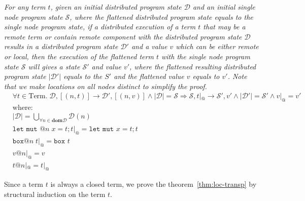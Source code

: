 \begin{theorem}
\emph{For any term $t$, given an initial distributed program state $\mathcal{D}$ and an initial single node program state $\mathcal{S}$, where the flattened distributed program state equals to the single node program state, if a distributed execution of a term $t$ that may be a remote term or contain remote component with the distributed program state $\mathcal{D}$ results in a distributed program state $\mathcal{D}'$ and a value $v$ which can be either remote or local, then the execution of the flattened term $t$ with the single node program state $\mathcal{S}$ will gives a state $\mathcal{S}'$ and value $v'$, where the flattened resulting distributed program state $|\mathcal{D}'|$ equals to the $S'$ and the flattened value $v$ equals to $v'$. Note that we make locations on all nodes distinct to simplify the proof.
\begin{align*}
    &\forall t \in \mathrm{Term}.\; \mathcal{D}, [(n, t)] \longrightarrow \mathcal{D'}, [(n, v)] \land |\mathcal{D}| = \mathcal{S}  \Rightarrow \mathcal{S},  t|_@ \longrightarrow \mathcal{S'}, v' \land |\mathcal{D}'| = \mathcal{S}' \land v|_@ = v'\\
    &\mathrm{where:}\\
    &|\mathcal{D}| = \bigcup_{\forall n \in \textbf{dom} \mathcal{D}} \mathcal{D}(n)\\
    &\texttt{let mut }@n\; x=t; t|_@ =  \texttt{let mut } x=t; t\\
    &\texttt{box}@n\; t |_@ = \texttt{box }t\\
    &v@n|_@ = v\\
    &t@n|_@ = t |_@
\end{align*}}
\label{chap3:thm:loc-transp}
\end{theorem}
Since a term $t$ is always a closed term, we prove the theorem~\ref{thm:loc-transp} by structural induction on the term $t$.
